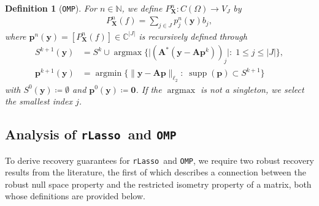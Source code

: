 \documentclass[11pt,reqno, a4paper]{article}
\numberwithin{equation}{section}
\newtheorem{definition}[theorem]{Definition}
\newcommand{\rlasso}{\texttt{rLasso}}
\newcommand{\omp}{\texttt{OMP}}
\DeclareMathOperator{\supp}{supp}
\DeclareMathOperator*{\argmax}{argmax}
\begin{document}
\begin{definition}[\omp]\label{def:OMP} 	
For $n\in \mathbb{N}$, we define $P_{\mathbf{X}}^n\colon C(\Omega) \to V_J$ by
\begin{gather}\label{eq:OMP_Decoder}
    P_{\mathbf{X}}^{n}(f) = \sum_{j \in J} p_j^n(\mathbf{y}) b_j,
\end{gather}
where $\mathbf{p}^n(\mathbf{y}) =[P_{\mathbf{X}}^n(f)]\in\mathbb{C}^{\lvert J\rvert}$ is recursively defined through
\begin{align}
    S^{k+1}(\mathbf{y}) & = S^k \cup \operatorname{argmax} \bigl\{\bigl\lvert\left(\mathbf{A}^\ast \left(\mathbf{y} - \mathbf{A}\mathbf{p}^k\right)\right)_j\bigr\rvert\colon \;  1 \leq j \leq \lvert J\rvert\bigr\},\label{eq:OMP_iteration1}\\
    \mathbf{p}^{k+1}(\mathbf{y}) & = \operatorname{argmin}\big\{\lVert \mathbf{y} - \mathbf{A}\mathbf{p}\rVert_{\ell_2}\colon \; \supp(\mathbf{p}) \subset S^{k+1}\big\}\label{eq:OMP_iteration2}
\end{align}
with $S^0(\mathbf{y}) \coloneqq \emptyset$ and $\mathbf{p}^0(\mathbf{y}) \coloneqq \mathbf{0}$.
If the $\argmax$ is not a singleton, we select the smallest index $j$.
\end{definition}

\subsection{Analysis of \rlasso \ and \omp}

To derive recovery guarantees for \rlasso \ and \omp, we require two robust recovery results from the literature, the first of which describes a connection between the robust null space property and the restricted isometry property of a matrix, both whose definitions are provided below.
\end{document}
